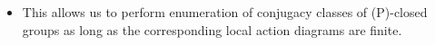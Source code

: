 \documentclass[preview]{standalone}
\begin{document}
\begin{center}
\begin{itemize} \item This allows us to perform enumeration of conjugacy classes of (P)-closed groups as long as the corresponding local action diagrams are finite.\end{itemize}
\end{center}
\end{document}

